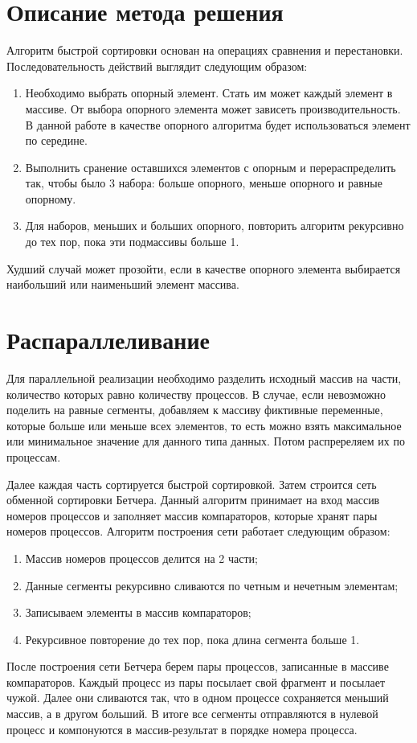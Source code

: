 \documentclass{report}
\begin{document}
\section*{Описание метода решения}
Алгоритм быстрой сортировки основан на операциях сравнения и перестановки. Последовательность действий выглядит следующим образом:
\begin{enumerate}
\item	Необходимо выбрать опорный элемент. Стать им может каждый элемент в массиве. От выбора опорного элемента может зависеть производительность. В данной работе в качестве опорного алгоритма будет использоваться элемент по середине.
\item Выполнить сранение оставшихся элементов с опорным и перераспределить так, чтобы было 3 набора: больше опорного, меньше опорного и равные опорному.
\item Для наборов, меньших и больших опорного, повторить алгоритм рекурсивно до тех пор, пока эти подмассивы больше 1.
\end{enumerate}
\par Худший случай может прозойти, если в качестве опорного элемента выбирается наибольший или наименьший элемент массива.
\newpage

\section*{Распараллеливание}
Для параллельной реализации необходимо разделить исходный массив на части, количество которых равно количеству процессов. В случае, если невозможно поделить на равные сегменты, добавляем к массиву фиктивные переменные, которые больше или меньше всех элементов, то есть можно взять максимальное или минимальное значение для данного типа данных. Потом распререляем их по процессам.
\par Далее каждая часть сортируется быстрой сортировкой. Затем строится сеть обменной сортировки Бетчера. Данный алгоритм принимает на вход массив номеров процессов и заполняет массив компараторов, которые хранят пары номеров процессов. Алгоритм построения сети работает следующим образом:
\begin{enumerate}
\item Массив номеров процессов делится на 2 части;
\item Данные сегменты рекурсивно сливаются  по четным и нечетным элементам;
\item Записываем элементы в массив компараторов;
\item Рекурсивное повторение до тех пор, пока длина сегмента больше 1.
\end{enumerate}
\par После построения сети Бетчера берем пары процессов, записанные в массиве компараторов. Каждый процесс из пары посылает свой фрагмент и посылает чужой. Далее они сливаются так, что в одном процессе сохраняется меньший массив, а в другом больший. В итоге все сегменты отправляются в нулевой процесс и компонуются в массив-результат в порядке номера процесса.
\end{document}
